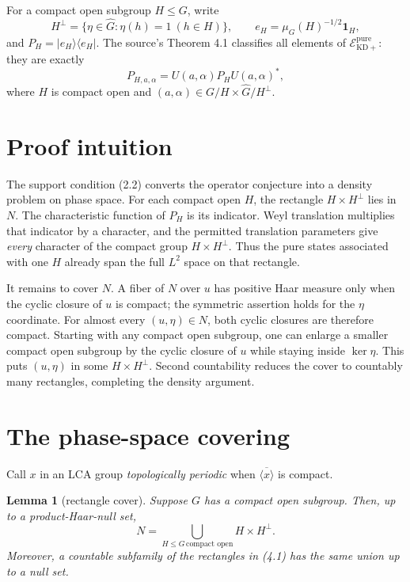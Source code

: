 \documentclass[11pt]{article}
\newtheorem{lemma}[theorem]{Lemma}
\theoremstyle{remark}
\newcommand{\Ghat}{\widehat G}
\newcommand{\Epp}{\mathcal E_{\mathrm{KD}+}^{\mathrm{pure}}}
\newcommand{\one}{\mathbf 1}
\begin{document}
For a compact open subgroup $H\leq G$, write
\[
 H^\perp=\{\eta\in\Ghat:\eta(h)=1\ (h\in H)\},\qquad
 e_H=\mu_G(H)^{-1/2}\one_H,
\]
and $P_H=|e_H\rangle\langle e_H|$.  The source's Theorem 4.1 classifies
all elements of $\Epp$: they are exactly
\[
 P_{H,a,\alpha}=U(a,\alpha)P_HU(a,\alpha)^*,                 \tag{2.3}
\]
where $H$ is compact open and
$(a,\alpha)\in G/H\times\Ghat/H^\perp$.

\section{Proof intuition}

The support condition (2.2) converts the operator conjecture into a density
problem on phase space.  For each compact open $H$, the rectangle
$H\times H^\perp$ lies in $N$.  The characteristic function of $P_H$ is its
indicator.  Weyl translation multiplies that indicator by a character, and
the permitted translation parameters give \emph{every} character of the
compact group $H\times H^\perp$.  Thus the pure states associated with one
$H$ already span the full $L^2$ space on that rectangle.

It remains to cover $N$.  A fiber of $N$ over $u$ has positive Haar measure
only when the cyclic closure of $u$ is compact; the symmetric assertion holds
for the $\eta$ coordinate.  For almost every $(u,\eta)\in N$, both cyclic
closures are therefore compact.  Starting with any compact open subgroup,
one can enlarge a smaller compact open subgroup by the cyclic closure of $u$
while staying inside $\ker\eta$.  This puts $(u,\eta)$ in some
$H\times H^\perp$.  Second countability reduces the cover to countably many
rectangles, completing the density argument.

\section{The phase-space covering}

Call $x$ in an LCA group \emph{topologically periodic} when
$\overline{\langle x\rangle}$ is compact.

\begin{lemma}[rectangle cover]\label{lem:cover}
Suppose $G$ has a compact open subgroup.  Then, up to a product-Haar-null
set,
\[
 N=\bigcup_{H\leq G\,\text{compact open}} H\times H^\perp.   \tag{4.1}
\]
Moreover, a countable subfamily of the rectangles in (4.1) has the same
union up to a null set.
\end{lemma}
\end{document}
